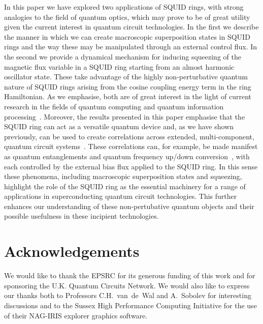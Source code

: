 \documentclass[twocolumn,a4paper,superscriptaddress,showpacs,floatfix,pra]{revtex4}
\begin{document}
In this paper  we have explored two applications  of SQUID rings, with
strong analogies to the field of quantum optics, which may prove to be
of  great  utility  given  the  current interest  in  quantum  circuit
technologies.  In the first  we describe  the manner  in which  we can
create  macroscopic superposition states  in SQUID  rings and  the way
these  may be  manipulated through  an external  control flux.  In the
second we provide a dynamical  mechanism for inducing squeezing of the
magnetic  flux  variable in  a  SQUID  ring  starting from  an  almost
harmonic  oscillator  state.  These   take  advantage  of  the  highly
non-perturbative quantum nature of SQUID rings arising from the cosine
coupling energy  term in the  ring Hamiltonian. As we  emphasise, both
are of great  interest in the light of current  research in the fields
of      quantum       computing      and      quantum      information
processing~\cite{lo_hk_1998,OrlandoMTvLLM99,MakhlinSS99,AverinNO90}. Moreover,
the results presented in this  paper emphasise that the SQUID ring can
act as  a versatile quantum device  and, as we  have shown previously,
can be  used to create correlations  across extended, multi-component,
quantum                                                         circuit
systems~\cite{EverittSCVRPP01,EverittCSPPVR01,Migliore2003a,Migliore2003b,Almaas2002,Saidi2002}. These
correlations   can,  for   example,  be   made  manifest   as  quantum
entanglements        and        quantum       frequency        up/down
conversion~\cite{EverittSCVRPP01,EverittCSPPVR01},      with      each
controlled by  the external  bias flux applied  to the SQUID  ring. In
this sense these phenomena, including macroscopic superposition states
and squeezing, highlight  the role of the SQUID  ring as the essential
machinery  for  a range  of  applications  in superconducting  quantum
circuit technologies. This further enhances our understanding of these
non-pertubative quantum objects and their possible usefulness in these
incipient technologies.

\section*{Acknowledgements}

We would like to thank the EPSRC for its generous funding of this work
and for  sponsoring the U.K.  Quantum Circuits Network. We  would also
like  to express  our thanks  both to  Professors  C.H.~van~de~Wal and
A.~Sobolev  for  interesting  discussions   and  to  the  Sussex  High
Performance  Computing  Initiative  for  the  use  of  their  NAG-IRIS
explorer graphics software.



\end{document}
